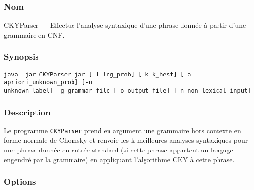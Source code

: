 \documentclass[12pt]{article}
\begin{document}
\subsubsection{Nom}
 
CKYParser --- Effectue l'analyse syntaxique d'une phrase donn\'ee \`a partir d'une
grammaire en CNF.
 
\subsubsection{Synopsis}
 
{\ttfamily
\begin{verbatim}
java -jar CKYParser.jar [-l log_prob] [-k k_best] [-a apriori_unknown_prob] [-u
unknown_label] -g grammar_file [-o output_file] [-n non_lexical_input]
\end{verbatim}
}
 
\subsubsection{Description}
 
Le programme \texttt{CKYParser} prend en argument une grammaire hors contexte
en forme normale de Chomsky et renvoie les k meilleures analyses syntaxiques
pour une phrase donn\'ee en entr\'ee standard (si cette phrase appartent au langage
engendr\'e par la grammaire) en appliquant l'algorithme CKY \`a cette phrase.

\subsubsection{Options}
\end{document}
